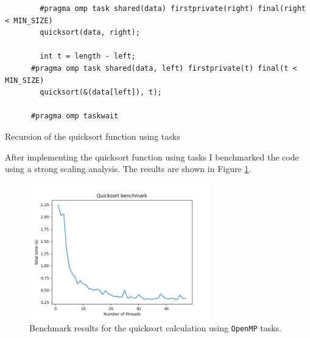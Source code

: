 \documentclass[unicode,11pt,a4paper,oneside,numbers=endperiod,openany]{scrartcl}
\begin{document}
\begin{listing}[h!t]
    \begin{verbatim}
        #pragma omp task shared(data) firstprivate(right) final(right < MIN_SIZE)
        quicksort(data, right);
      
        int t = length - left;
      #pragma omp task shared(data, left) firstprivate(t) final(t < MIN_SIZE)
        quicksort(&(data[left]), t);
      
      #pragma omp taskwait
    \end{verbatim}
    \caption{Recursion of the quicksort function using tasks}
    \label{lst:quicksort_tasks}
\end{listing}

After implementing the quicksort function using tasks I benchmarked the code using a strong scaling analysis. The results are shown in Figure \ref{fig:quicksort_benchmark}.

\begin{figure}[h]
    \centering
    \includegraphics[width=0.7\textwidth]{../code/quicksort/benchmark.png}
    \caption{Benchmark results for the quicksort calculation using \texttt{OpenMP} tasks.}
    \label{fig:quicksort_benchmark}
\end{figure}
\end{document}
